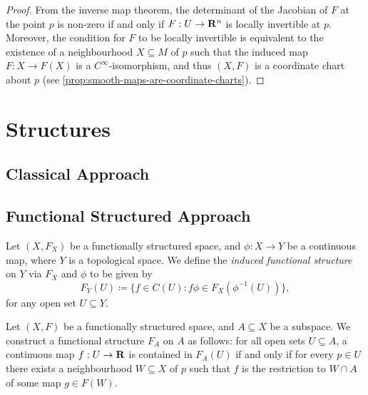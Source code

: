 \begin{proof}
    From the inverse map theorem, the determinant of the Jacobian of \(F\) at the
    point \(p\) is non-zero if and only if \(F: U \to \mathbf{R}^n\) is locally invertible
    at \(p\). Moreover, the condition for \(F\) to be locally invertible is
    equivalent to the existence of a neighbourhood \(X \subseteq M\) of \(p\) such
    that the induced map \(F: X \to F(X)\) is a \(C^{\infty}\)-isomorphism, and thus
    \((X, F)\) is a coordinate chart about \(p\) (see
    \cref{prop:smooth-maps-are-coordinate-charts}).
\end{proof}

\section{Structures}

\subsection{Classical Approach}

\subsection{Functional Structured Approach}

\begin{definition}
    \label{def:induced-functional-structure-space}
    Let \((X, F_X)\) be a functionally structured space, and \(\phi: X \to Y\) be a
    continuous map, where \(Y\) is a topological space. We define the \emph{induced
        functional structure} on \(Y\) via \(F_X\) and \(\phi\) to be given by
    \[
        F_Y(U) \coloneq \{f \in C(U) \colon f \phi \in F_X(\phi^{-1}(U))\},
    \]
    for any open set \(U \subseteq Y\).
\end{definition}

\begin{definition}
    \label{def:induced-func-struc-on-subspace}
    Let \((X, F)\) be a functionally structured space, and \(A \subseteq X\) be a
    subspace. We construct a functional structure \(F_A\) on \(A\) as follows: for
    all open sets \(U \subseteq A\), a continuous map \(f: U \to \mathbf{R}\) is contained
    in \(F_A(U)\) if and only if for every \(p \in U\) there exists a neighbourhood
    \(W \subseteq X\) of \(p\) such that \(f\) is the restriction to \(W \cap A\) of
    some map \(g \in F(W)\).
\end{definition}

